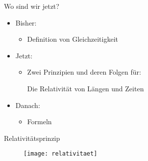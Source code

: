 \documentclass[]{beamer}%
\newcommand{\boxedBasis}[6]{%
    \draw[line width=1pt*#5,->] (0,0)--(1,0)
        node[transform shape, scale=#6, anchor=north]      {#1};

    \draw[line width=1pt*#5,->] (0,0)--(0.5,0.5)
        node[transform shape, scale=#6, anchor=west]       {#2};

    \draw[line width=1pt*#5,->] (0,0)--(0,1)
        node[transform shape, scale=#6, anchor=east]       {#3};

    \tikzmath{\offset=0.6;}

    \draw[line width=1pt*#5, draw=black] 
        (-\offset, -\offset) rectangle 
        ( 1+0.5*\offset, 1+0.5*\offset) 
        node[   midway, 
                label={[label distance=0.8cm, transform shape]0:{#4}}]{};
}
\begin{document}
\begin{frame}
\end{frame}

\begin{frame}{Wo sind wir jetzt?}
    \begin{itemize}
        \item Bisher:
            \begin{itemize}
                \item Definition von Gleichzeitigkeit
            \end{itemize}
        \vspace{5pt}
        \item Jetzt:
            \begin{itemize}
                \item Zwei  Prinzipien und deren Folgen für:
                    \begin{center}
                        Die Relativität von Längen und Zeiten
                    \end{center}
            \end{itemize}
        \vspace{5pt}
        \item Danach:
            \begin{itemize}
                \item Formeln
            \end{itemize}
    \end{itemize}
\end{frame}

\begin{frame}{Relativitätsprinzip}
    \begin{figure}[h]
            \centering
            \texttt{[image: relativitaet]}
            \caption{\cite{Einstein1905}}
    \end{figure}
\end{frame}

\begin{frame}
\end{frame}
\end{document}
